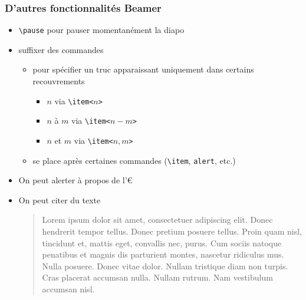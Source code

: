\begin{frame}[fragile]
  \frametitle{D'autres fonctionnalités Beamer}

    
  \begin{itemize}
  \item \verb|\pause| pour pauser momentanément la diapo
    \pause
  \item<2> suffixer des commandes

    \begin{itemize}
    \item pour spécifier un truc apparaissant uniquement dans certains recouvrements

      \begin{itemize}
      \item $n$ via \verb|\item<|$n$\verb|>|
      \item $n$ à $m$ via \verb|\item<|$n-m$\verb|>|
      \item $n$ et $m$ via \verb|\item<|$n,m$\verb|>|
      \end{itemize}

    \item se place après certaines commandes (\verb|\item|, \verb|alert|, etc.)
    \end{itemize}

  \end{itemize}
  
  \pause  
  
  
  \begin{itemize}
  \item On peut \alert{alerter} à propos de l'€
  \item On peut citer du texte
    
    \begin{quotation}
      Lorem ipsum dolor sit amet, consectetuer adipiscing elit. Donec hendrerit tempor tellus. Donec pretium posuere tellus. Proin quam nisl, tincidunt et, mattis eget, convallis nec, purus. Cum sociis natoque penatibus et magnis dis parturient montes, nascetur ridiculus mus. Nulla posuere. Donec vitae dolor. Nullam tristique diam non turpis. Cras placerat accumsan nulla. Nullam rutrum. Nam vestibulum accumsan nisl.
    \end{quotation}
    
  \end{itemize} 
\end{frame}

